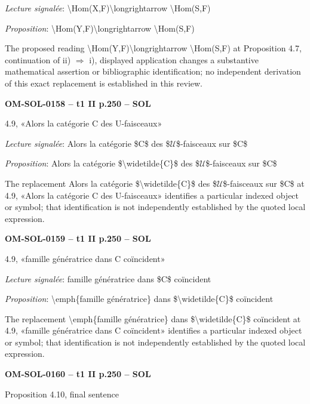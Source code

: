 \emph{Lecture signalée}: \textbackslash{}Hom(X,F)\textbackslash{}longrightarrow \textbackslash{}Hom(S,F)\par
\emph{Proposition}: \textbackslash{}Hom(Y,F)\textbackslash{}longrightarrow \textbackslash{}Hom(S,F)\par
The proposed reading \textbackslash{}Hom(Y,F)\textbackslash{}longrightarrow \textbackslash{}Hom(S,F) at Proposition 4.7, continuation of ii) \ensuremath{\Rightarrow} i), displayed application changes a substantive mathematical assertion or bibliographic identification; no independent derivation of this exact replacement is established in this review.\par
\par\noindent\textbf{OM-SOL-0158 -- t1 II p.250 -- SOL}\par
4.9, «Alors la catégorie C des U-faisceaux»\par
\emph{Lecture signalée}: Alors la catégorie \$C\$ des \$\ensuremath{𝒰}\$-faisceaux sur \$C\$\par
\emph{Proposition}: Alors la catégorie \$\textbackslash{}widetilde\{C\}\$ des \$\ensuremath{𝒰}\$-faisceaux sur \$C\$\par
The replacement Alors la catégorie \$\textbackslash{}widetilde\{C\}\$ des \$\ensuremath{𝒰}\$-faisceaux sur \$C\$ at 4.9, «Alors la catégorie C des U-faisceaux» identifies a particular indexed object or symbol; that identification is not independently established by the quoted local expression.\par
\par\noindent\textbf{OM-SOL-0159 -- t1 II p.250 -- SOL}\par
4.9, «famille génératrice dans C coïncident»\par
\emph{Lecture signalée}: famille génératrice dans \$C\$ coïncident\par
\emph{Proposition}: \textbackslash{}emph\{famille génératrice\} dans \$\textbackslash{}widetilde\{C\}\$ coïncident\par
The replacement \textbackslash{}emph\{famille génératrice\} dans \$\textbackslash{}widetilde\{C\}\$ coïncident at 4.9, «famille génératrice dans C coïncident» identifies a particular indexed object or symbol; that identification is not independently established by the quoted local expression.\par
\par\noindent\textbf{OM-SOL-0160 -- t1 II p.250 -- SOL}\par
Proposition 4.10, final sentence\par
